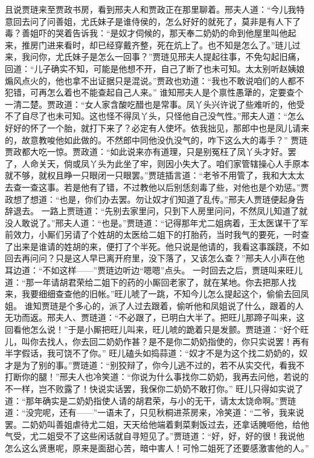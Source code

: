 \documentclass[12pt,oneside]{book}
\begin{document}
且说贾琏来至贾政书房，看到邢夫人和贾政正在那里聊着。邢夫人道：“今儿我特意回去问了问善姐，尤氏妹子是谁侍侯的，怎么好好的就死了，莫非是有人下了毒？善姐吓的哭着告诉我：“是奴才伺候的，那天奉二奶奶的命到他屋里叫他起来，推房门进来看时，却已经穿戴齐整，死在炕上了。也不知是怎么了。”琏儿过来，我问你，尤氏妹子是怎么一回事？”贾琏见邢夫人提起往事，不免勾起旧痛，回道：“儿子确实不知，可能是他想不开，自己了断了也未可知。太太别听赵姨娘煽风点火的，他也拿不出证据只是混说。”贾政也劝道：“我也不敢说咱们的人都不犯错，可再怎么着也不能查起自己人来。”
谁知邢夫人是个禀性愚犟的，定要查个一清二楚。贾政道：“女人家含酸吃醋也是常事。凤丫头兴许说了些难听的，他受不了自尽了也未可知。这也怪不得凤丫头，只怪他自己没气性。”邢夫人道：“怎么好好的怀了一个胎，就打下来了？必定有人使坏。依我拙见，那郎中也是凤儿请来的，故意教唆他如此做的。不然郎中同他没仇没气的，咋下这么大的毒手？”
贾琏贾政都大吃一惊。贾政道：“如此说来亦有道理，只是别冤枉了凤丫头才好。罢了，人命关天，倘或凤丫头为此坐了牢，则因小失大了。咱们家管辖操心人手原本就不够，就权且睁一只眼闭一只眼罢。”贾琏插言道：“老爷不用管了，我和大太太去查一查这事。若是他有了错，不过教他以后别恁刻毒了些，对他也是个劝惩。”贾政想了想道：“也是，你们办去罢。勿让奴才们知道了乱传。”邢夫人贾琏便起身告辞退去。
一路上贾琏道：“先别去家里问，只到下人房里问问，不然凤儿知道了就没人敢说了。”邢夫人道：“也是。”贾琏道：“记得那年尤二姐病着，王太医谋干了军前效力，小厮们另请了个姓胡的太医给二姐下的打胎药，当时我气的要死，一时查了出来是谁请的姓胡的来，便打了个半死。他只说是他请的，我看这事蹊跷，不如回去再问问？只是这人早已离开府里，没下落了，又该怎么查？”邢夫人小声在他耳边道：“不如这样——”贾琏边听边“嗯嗯”点头。
一时回去之后，贾琏叫来旺儿道：“那一年请胡君荣给二姐下的药的小厮回老家了，就在某地。你去把那人找来，我要细细查查他的旧帐。”旺儿唬了一跳，不知今儿怎么提起这个，偷偷去回凤姐。
谁知贾琏是个多心的，派了人过去跟着，偷听他和凤姐说了什么，跟着的人无功而返。邢夫人、贾琏道：“不必跟了，已明白大半了。把旺儿那蹄子叫来，这回看他怎么说！”于是小厮把旺儿叫来，旺儿唬的跪着只是发颤。贾琏道：“好个旺儿，叫你去找人，你去回二奶奶作甚？是不是你二奶奶指使的，你只实说罢！再有半字假话，我可饶不了你。”
旺儿磕头如捣蒜道：“奴才不是为这个找二奶奶的，奴才是为了别的事。”贾琏道：“别狡辩了，你今儿逃不过的，若不从实交代，看我不打断你的腿！”邢夫人也冷笑道：“你说为什么事找你二奶奶，我再去问他，若说的不一样，岂不败露了！快说实话罢，我保你二奶奶不敢打你。”
旺儿只得如实说了道：“那年确实是二奶奶指使人请的胡君荣，与小的无干，请太太饶命啊。”贾琏道：“没完呢，还有——”一语未了，只见秋桐进茶房来，冷笑道：“二爷，我来说罢。二奶奶叫善姐虐待尤二姐，天天给他端着剩菜剩饭过去，还拿话腌咂他，给他气受，尤二姐受不了这些闲话就自寻短见了。”贾琏道：“好，好，好的很！我说他怎么这么贤惠呢，原来是面甜心苦，暗中害人！可怜二姐死了还要感激害他的人。”
\end{document}
